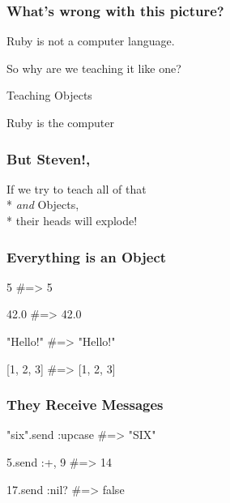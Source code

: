 \documentclass[20pt]{beamer}
\begin{document}
\begin{frame}
\frametitle{What's wrong with this picture?}
{
}
\end{frame}

\begin{frame}
\par {Ruby is not a computer language.}
\vspace{4cm}\pause
\par {So why are we teaching it like one?}
\end{frame}

{
\begin{frame}
\par{ Teaching Objects}
\par\vspace{3cm}
\hfill{Ruby is the computer}
\end{frame}
}

\begin{frame}
\frametitle{But Steven!,}
If we try to teach all of that\\* \emph{and} Objects,\\*
their heads will explode!
\end{frame}

\begin{frame}[fragile]
\frametitle{Everything is an Object}
\begin{rubycode}
5 #=> 5

42.0 #=> 42.0

"Hello!" #=> "Hello!"

[1, 2, 3] #=> [1, 2, 3]
\end{rubycode}
\end{frame}

\begin{frame}[fragile]
\frametitle{They  Receive Messages}
\begin{rubycode}
"six".send :upcase
#=> "SIX"

5.send :+, 9
#=> 14

17.send :nil?
#=> false
\end{rubycode}
\end{frame}
\end{document}
